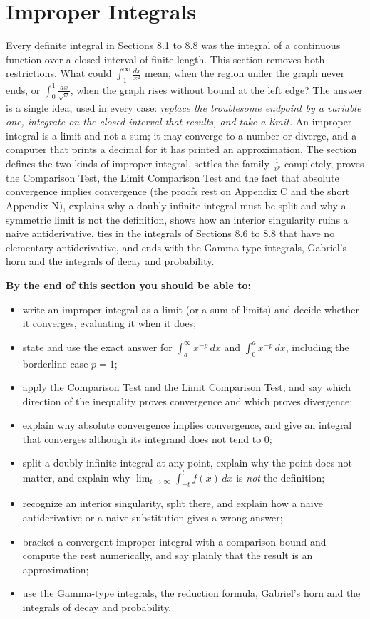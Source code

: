 \documentclass[11pt]{article}
\begin{document}
\section{Improper Integrals}

\begin{guide}
Every definite integral in Sections 8.1 to 8.8 was the integral of a continuous function over a closed interval of finite length. This section removes both restrictions. What could $\int_1^\infty\frac{dx}{x^2}$ mean, when the region under the graph never ends, or $\int_0^1\frac{dx}{\sqrt x}$, when the graph rises without bound at the left edge? The answer is a single idea, used in every case: \emph{replace the troublesome endpoint by a variable one, integrate on the closed interval that results, and take a limit.} An improper integral is a limit and not a sum; it may converge to a number or diverge, and a computer that prints a decimal for it has printed an approximation. The section defines the two kinds of improper integral, settles the family $\frac1{x^p}$ completely, proves the Comparison Test, the Limit Comparison Test and the fact that absolute convergence implies convergence (the proofs rest on Appendix C and the short Appendix N), explains why a doubly infinite integral must be split and why a symmetric limit is not the definition, shows how an interior singularity ruins a naive antiderivative, ties in the integrals of Sections 8.6 to 8.8 that have no elementary antiderivative, and ends with the Gamma-type integrals, Gabriel's horn and the integrals of decay and probability.
\end{guide}

\textbf{By the end of this section you should be able to:}
\begin{itemize}
  \item write an improper integral as a limit (or a sum of limits) and decide whether it converges, evaluating it when it does;
  \item state and use the exact answer for $\int_a^\infty x^{-p}\,dx$ and $\int_0^a x^{-p}\,dx$, including the borderline case $p=1$;
  \item apply the Comparison Test and the Limit Comparison Test, and say which direction of the inequality proves convergence and which proves divergence;
  \item explain why absolute convergence implies convergence, and give an integral that converges although its integrand does not tend to $0$;
  \item split a doubly infinite integral at any point, explain why the point does not matter, and explain why $\lim_{t\to\infty}\int_{-t}^tf(x)\,dx$ is \emph{not} the definition;
  \item recognize an interior singularity, split there, and explain how a naive antiderivative or a naive substitution gives a wrong answer;
  \item bracket a convergent improper integral with a comparison bound and compute the rest numerically, and say plainly that the result is an approximation;
  \item use the Gamma-type integrals, the reduction formula, Gabriel's horn and the integrals of decay and probability.
\end{itemize}
\end{document}
